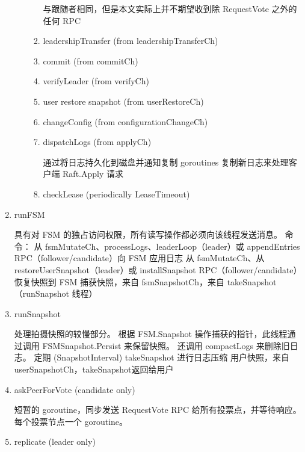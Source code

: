 \begin{enumerate}
\begin{enumerate}
\begin{enumerate}
						与跟随者相同，但是本文实际上并不期望收到除 RequestVote 之外的任何 RPC

						\item leadershipTransfer (from leadershipTransferCh) 
						
						\item commit (from commitCh) 
						
						\item verifyLeader (from verifyCh) 
						
						\item user restore snapshot (from userRestoreCh) 
						
						\item changeConfig (from configurationChangeCh) 
						
						\item dispatchLogs (from applyCh) 
						
						通过将日志持久化到磁盘并通知复制 goroutines 复制新日志来处理客户端 Raft.Apply 请求
						
						\item checkLease (periodically LeaseTimeout) 
						
					\end{enumerate}
				\end{enumerate}
				
				
				\item runFSM 
				
				具有对 FSM 的独占访问权限，所有读写操作都必须向该线程发送消息。 命令：
从 fsmMutateCh、processLogs、leaderLoop（leader）或 appendEntries RPC（follower/candidate）向 FSM 应用日志
从 fsmMutateCh、从 restoreUserSnapshot（leader）或 installSnapshot RPC（follower/candidate）恢复快照到 FSM
捕获快照，来自 fsmSnapshotCh，来自 takeSnapshot（runSnapshot 线程）

				\item runSnapshot
				
				处理拍摄快照的较慢部分。 根据 FSM.Snapshot 操作捕获的指针，此线程通过调用 FSMSnapshot.Persist 来保留快照。 还调用 compactLogs 来删除旧日志。
定期 (SnapshotInterval) takeSnapshot 进行日志压缩
用户快照，来自userSnapshotCh，takeSnapshot返回给用户
				
				\item askPeerForVote (candidate only)
				
				短暂的 goroutine，同步发送 RequestVote RPC 给所有投票点，并等待响应。 每个投票节点一个 goroutine。
				
				\item replicate (leader only)
				

\end{enumerate}
